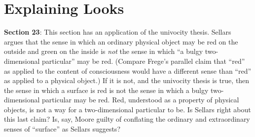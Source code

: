 \documentclass[11pt]{article}
\begin{document}

\section{Explaining Looks} %
\label{sec:explaining_looks}

\textbf{Section 23}: This section has an application of the univocity thesis. Sellars argues that the sense in which an ordinary physical object may be red on the outside and green on the inside is \emph{not} the sense in which ``a bulgy two-dimensional particular'' may be red. (Compare Frege's parallel claim that ``red'' as applied to the content of consciousness would have a different sense than ``red'' as applied to a physical object.) If it is not, and the univocity thesis is true, then the sense in which a surface is red is not the sense in which a bulgy two-dimensional particular may be red. Red, understood as a property of physical objects, is not a way for a two-dimensional particular to be. Is Sellars right about this last claim? Is, say, Moore guilty of conflating the ordinary and extraordinary senses of ``surface'' as Sellars suggests?

\end{document}
